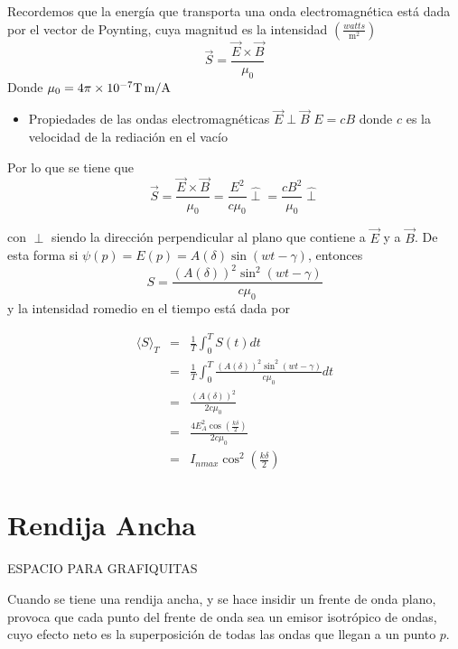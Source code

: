 \documentclass{article}
\begin{document}
        Recordemos que la energía que transporta una onda electromagnética
        está dada por el vector de Poynting, cuya magnitud es la intensidad
        \((\frac{watts}{\si{\meter\squared}})\) 
        \[\vec{S} = \frac{\vec{E} \times \vec{B}}{\mu_0}\]
        Donde $\mu_0 = 4\pi \times 10^{-7} \unit[per-mode = symbol]{\T\meter\per\ampere}$

        \begin{itemize}
            \item Propiedades de las ondas electromagnéticas
            \subitem $\vec{E} \perp \vec{B}$
            \subitem $E = cB$ donde $c$ es la velocidad de 
            la rediación en el vacío
        \end{itemize}

        Por lo que se tiene que
        \[\vec{S} = \frac{\vec{E} \times \vec{B}}{\mu_0} = 
        \frac{E^2}{c\mu_0} \widehat{\perp} = \frac{cB^2}{\mu_0} \widehat{\perp}\]
        
        con $\widehat{\perp}$ siendo la dirección perpendicular 
        al plano que contiene a $\vec{E}$ y a $\vec{B}$. 
        De esta forma si \(\psi(p) = E(p) = A(\delta)\sin(wt-\gamma)\),
        entonces 
        \[S = \frac{(A(\delta))^2\sin^2(wt-\gamma)}{c\mu_0}\] 
        y la intensidad romedio en el tiempo está dada por 

        \begin{eqnarray}
            \langle S \rangle_T &=& 
            \frac{1}{T}\int_{0}^{T} S(t)dt \\
            &=& \frac{1}{T}\int_{0}^{T}\frac{(A(\delta))^2\sin^2(wt-\gamma)}
            {c\mu_0}dt \\
            &=& \frac{(A(\delta))^2}{2c\mu_0}\\
            &=& \frac{4E_A^2\cos(\frac{k\delta}{2})}{2c\mu_0}\\
            &=& I_{nmax}\cos^2(\frac{k\delta}{2})
        \end{eqnarray}

        \section{Rendija Ancha}



        ESPACIO PARA GRAFIQUITAS

        Cuando se tiene una rendija ancha, y se hace insidir 
        un frente de onda plano, provoca que cada punto del 
        frente de onda sea un emisor isotrópico de ondas, cuyo 
        efecto neto es la superposición de todas las ondas que
        llegan a un punto $p$.
\end{document}
